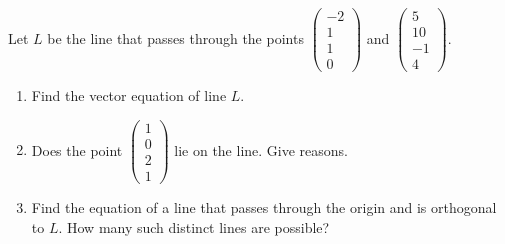 \begin{problem}{\problemnum} 
Let $L$ be the line that passes through the points $\begin{pmatrix}-2\\1\\1\\0\end{pmatrix}$ and $\begin{pmatrix}5\\10\\-1\\4\end{pmatrix}$.
    \begin{enumerate}
        \item Find the vector equation of line $L$.
        \item Does the point $\begin{pmatrix}1\\0\\2\\1\end{pmatrix}$ lie on the line. Give reasons.
        \item Find the equation of a line that passes through the origin and is orthogonal to $L$. How many such distinct lines are possible?
    \end{enumerate}
\end{problem}
